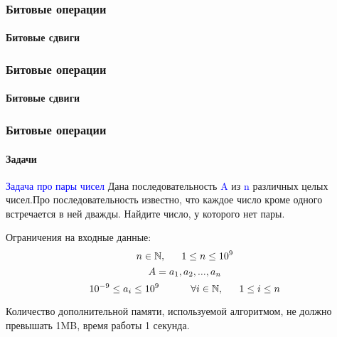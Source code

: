 \documentclass[aspectratio=169]{beamer}
\begin{document}
\begin{frame}
\frametitle{Битовые операции}
\framesubtitle{Битовые сдвиги}
\justifying
\begin{figure}
    \captionsetup[subfigure]{labelformat=empty}
    \centering
\end{figure}
\end{frame}

\begin{frame}
\frametitle{Битовые операции}
\framesubtitle{Битовые сдвиги}
\justifying
\begin{figure}
    \captionsetup[subfigure]{labelformat=empty}
    \centering
\end{figure}
\end{frame}

\begin{frame}
\frametitle{Битовые операции}
\framesubtitle{Задачи}
\justifying
\small

\textcolor{blue}{Задача про пары чисел}\newline
Дана последовательность \textcolor{blue}{A} из \textcolor{blue}{n} различных целых чисел.\newline Про последовательность известно, что каждое число кроме одного встречается в ней дважды. Найдите число, у которого нет пары.\newline

Ограничения на входные данные:\newline
$$\LARGE n \in \mathbb{N}, \quad 1 \leq n \leq 10^{9}$$
$$\LARGE A = a_{1}, a_{2}, ... , a_{n}$$
$$\LARGE 10^{-9}\leq a_i \leq 10^{9} \quad\quad \forall i \in \mathbb{N},\quad 1 \leq i \leq n$$

Количество дополнительной памяти, используемой алгоритмом, не должно превышать 1MB, время работы 1 секунда.

\end{frame}
\end{document}
